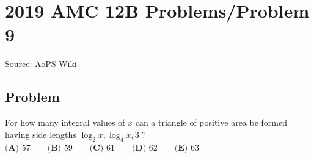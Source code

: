 \documentclass[12pt]{article}
\begin{document}
\section*{{2019 AMC 12B Problems/Problem 9}}
Source: AoPS Wiki

\subsection*{Problem}
For how many integral values of $x$ can a triangle of positive area be formed having side lengths $\log_{2} x, \log_{4} x, 3$ ? $\textbf{(A) } 57 \qquad\textbf{(B) } 59 \qquad\textbf{(C) } 61 \qquad\textbf{(D) } 62 \qquad\textbf{(E) } 63$
\end{document}
